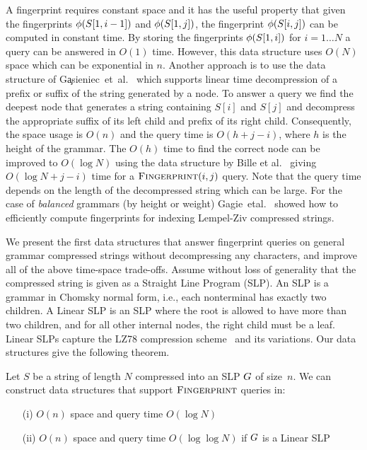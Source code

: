 A fingerprint requires constant space and it has the useful property that given the fingerprints $\phi(S[1, i-1])$ and $\phi(S[1, j])$, the fingerprint $\phi(S[i, j])$ can be computed in constant time. By storing the fingerprints $\phi(S[1, i])$ for $i=1\ldots N$ a query can be answered in $O(1)$ time. However, this data structure uses $O(N)$ space which can be exponential in $n$. Another approach is to use the data structure of G\c{a}sieniec~et~al.~\cite{gasieniec2005real} which supports linear time decompression of a prefix or suffix of the string generated by a node. To answer a query we find the deepest node that generates a string containing $S[i]$ and $S[j]$ and decompress the appropriate suffix of its left child and prefix of its right child. Consequently, the space usage is $O(n)$ and the query time is $O(h+j-i)$, where $h$ is the height of the grammar. The $O(h)$ time to find the correct node can be improved to $O(\log N)$ using the data structure by Bille et al.~\cite{bille2011random} giving $O(\log N + j-i)$ time for a $\textsc{Fingerprint}(i, j)$ query. Note that the query time depends on the length of the decompressed string which can be large. For the case of \emph{balanced} grammars (by height or weight) Gagie~etal.~\cite{gagiefingerprint} showed how to efficiently compute fingerprints for indexing Lempel-Ziv compressed strings.

We present the first data structures that answer fingerprint queries on general grammar compressed strings without decompressing any characters, and improve all of the above time-space trade-offs. Assume without loss of generality that the compressed string is given as a Straight Line Program (SLP). An SLP is a grammar in Chomsky normal form, i.e., each nonterminal has exactly two children. A Linear SLP is an SLP where the root is allowed to have more than two children, and for all other internal nodes, the right child must be a leaf. Linear SLPs capture the LZ78 compression scheme~\cite{lz78} and its variations. Our data structures give the following theorem.

\begin{theorem}\label{thm:fp}
	Let $S$ be a string of length $N$ compressed into an SLP $G$ of size~$n$. We can construct data structures that support $\textsc{Fingerprint}$ queries in:
	\begin{enumerate}
		\item[(i)] $O(n)$ space and query time $O(\log N)$
		\item[(ii)] $O(n)$ space and query time $O(\log \log N)$ if $G$ is a Linear SLP
	\end{enumerate}
\end{theorem}

